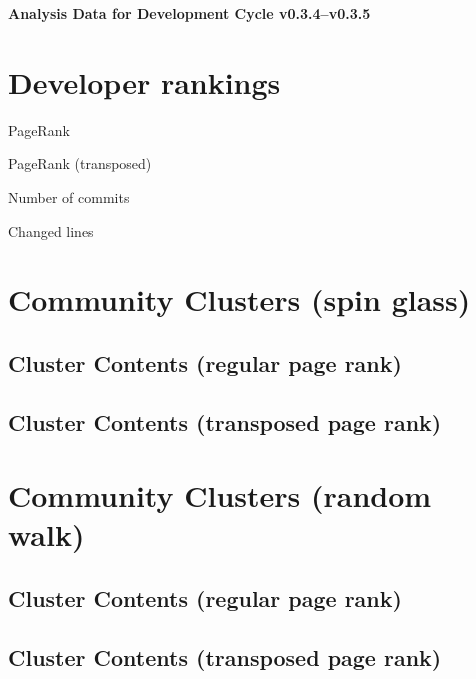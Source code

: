 \documentclass{article}
\begin{document}
\setlength{\parindent}{0pt}
\begin{center}
\begin{Large}
\textbf{Analysis Data for Development Cycle v0.3.4--v0.3.5}
\end{Large}
\end{center}
\section{Developer rankings}
\begin{small}\renewcommand{\tabcolsep}{1pt}
\begin{minipage}{0.5\linewidth}
PageRank\\

\end{minipage}%
\begin{minipage}{0.5\linewidth}
PageRank (transposed)\\

\end{minipage}

\renewcommand{\tabcolsep}{5pt}
\begin{minipage}{0.5\linewidth}
Number of commits\\

\end{minipage}%
\begin{minipage}{0.5\linewidth}
Changed lines\\

\end{minipage}
\end{small}
\newpage\section{Community Clusters (spin glass)}
\subsection{Cluster Contents (regular page rank)}
\newpage\subsection{Cluster Contents (transposed page rank)}
\newpage\section{Community Clusters (random walk)}
\subsection{Cluster Contents (regular page rank)}
\newpage\subsection{Cluster Contents (transposed page rank)}
\end{document}
